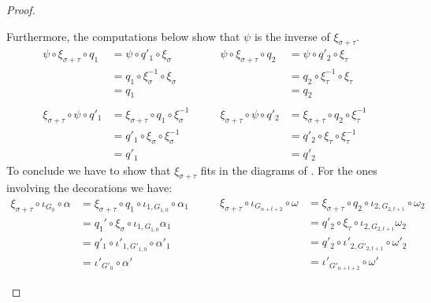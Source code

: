 \begin{proof}
\begin{itemize}
Furthermore, the computations below show that $\psi$ is the inverse of $\xi_{\sigma+\tau}$.
\[\begin{split}
	\psi \circ \xi_{\sigma+\tau}\circ  q_1&=\psi \circ q'_1\circ \xi_\sigma \\&=q_1\circ \xi^{-1}_{\sigma}\circ \xi_\sigma\\&=q_1\\\\
	\xi_{\sigma+\tau}\circ \psi \circ q'_1&=\xi_{\sigma+\tau}\circ q_1\circ \xi^{-1}_\sigma \\&=q'_1\circ \xi_{\sigma}\circ \xi^{-1}_\sigma\\&=q'_1
\end{split}\qquad \begin{split}
	\psi \circ \xi_{\sigma+\tau}\circ  q_2&=\psi \circ q'_2\circ \xi_\tau \\&=q_2\circ \xi^{-1}_{\tau}\circ \xi_\tau\\&=q_2\\ \\ 	\xi_{\sigma+\tau}\circ \psi \circ q'_2&=\xi_{\sigma+\tau}\circ q_2\circ \xi^{-1}_\tau \\&=q'_2\circ \xi_{\tau}\circ \xi^{-1}_\tau\\&=q'_2
\end{split}\]
To conclude we have to show that $\xi_{\sigma+\tau}$ fits in the diagrams of .  For the ones involving the decorations we have:
\[\begin{split}
	\xi_{\sigma+\tau} \circ \iota_{G_{0}}\circ \alpha&=\xi_{\sigma+\tau} \circ q_1 \circ \iota_{1,G_{1,0}}\circ \alpha_1\\&=q_1'\circ \xi_\sigma \circ  \iota_{1,G_{1,0}} \alpha_1\\&=q'_1\circ \iota'_{1, G'_{1,0}}\circ \alpha'_1\\&=\iota'_{G'_0}\circ \alpha'
\end{split}  \qquad 
\begin{split}
\xi_{\sigma+\tau} \circ \iota_{G_{n+t+2}}\circ \omega&=\xi_{\sigma+\tau} \circ q_2 \circ \iota_{2,G_{2,t+1}}\circ \omega_2\\&=q'_2\circ \xi_\tau \circ  \iota_{2,G_{2,t+1}} \omega_2\\&=q'_2\circ \iota'_{2, G'_{2,t+1}}\circ \omega'_2\\&=\iota'_{G'_{n+t+2}}\circ \omega'
\end{split}  \]


\end{itemize}
\end{proof}
